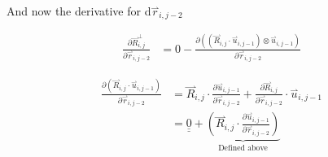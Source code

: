 \documentclass{article}
\renewcommand{\ij}{_{i,j}}
\newcommand{\ijj}{_{i,j-1}}
\newcommand{\ijk}{_{i,j-2}}
\newcommand{\ijjj}{_{i,j-2}}
\renewcommand{\part}[2]{\frac{\partial #1 }{\partial #2}}
\newcommand{\harp}{\overset{\rightharpoonup}}
\newcommand{\ten}[1]{\underline{\underline{#1}}}
\newcommand{\Rij}{\harp R \ij}
\newcommand{\rijjj}{\harp r \ijjj}
\newcommand{\uijj}{\harp u \ijj}
\begin{document}
And now the derivative for d$\rijjj$

\begin{align*}
  \part{\harp R\ij ^ \bot}{\harp r\ijk}  &=  
  0
  - \part{\left(\left(\harp R\ij \cdot \harp u \ijj \right) \otimes 
  \harp u \ijj \right)
  }{\harp r\ijjj}
\end{align*}


\begin{align*}
  \part{\left(\harp R\ij \cdot \harp u \ijj \right)}{\harp r\ijk}   
  &= 
  \harp R\ij \cdot \part{\harp u \ijj}{\harp r \ijjj} + 
  \part{\harp R \ij}{\harp r \ijjj} \cdot \harp u\ijj
  \\
  &= 
  \ten{0} + 
  \underbrace{
  \left(
  \Rij \cdot  \part{\uijj}{\rijjj} 
  \right)}_{\text{Defined above}}
\end{align*}
\end{document}

